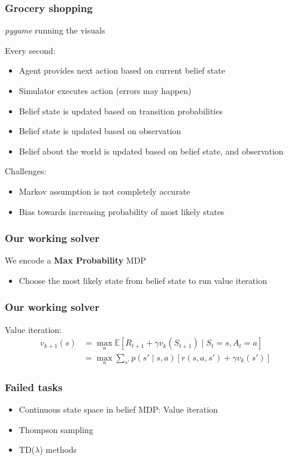 \documentclass[10pt, compress]{beamer}
\begin{document}
\begin{frame}[fragile]
  \frametitle{Grocery shopping}

  {\it pygame} running the visuals

  Every second:
  \begin{itemize}
  \item Agent provides next action based on current belief state
  \item Simulator executes action (errors may happen)
  \item Belief state is updated based on transition probabilities
  \item Belief state is updated based on observation
  \item Belief about the world is updated based on belief state, and observation
  \end{itemize}

  Challenges:
  \begin{itemize}
  \item Markov assumption is not completely accurate
  \item Bias towards increasing probability of most likely states
  \end{itemize}
\end{frame}


\begin{frame}[fragile]
  \frametitle{Our working solver}
  We encode a \textbf{Max Probability} MDP
  \begin{itemize}
  \item Choose the most likely state from belief state to run value iteration
  \end{itemize}
\end{frame}

\begin{frame}[fragile]
  \frametitle{Our working solver}
  Value iteration:
  \begin{align*}
  v_{k+1}(s) &= \max_a \mathbb{E}[R_{t+1} + \gamma v_k(S_{t+1}) \mid S_t = s, A_t = a] \\
  &= \max_a \sum_{s'} p(s' \mid s,a) [r(s,a,s') + \gamma v_k(s')]
  \end{align*}
\end{frame}

\begin{frame}[fragile]
  \frametitle{Failed tasks}

  \begin{itemize}
  \item Continuous state space in belief MDP: Value iteration
  \item Thompson sampling
  \item TD($\lambda$) methods
  \end{itemize}
\end{frame}
\end{document}

